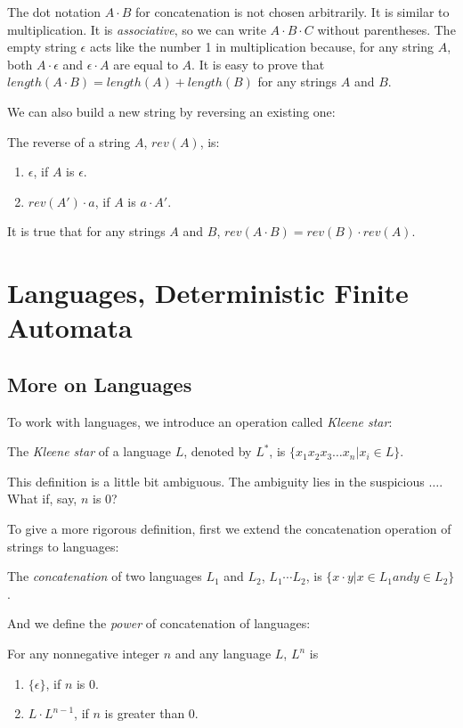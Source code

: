 \documentclass[11pt]{article}
\begin{document}
The dot notation $A \cdot B$ for concatenation is not chosen arbitrarily. It is similar to multiplication. It is \emph{associative}, so we can write $A \cdot B \cdot C$ without parentheses. The empty string $\epsilon$ acts like the number 1 in multiplication because, for any string $A$, both $A \cdot \epsilon$ and $\epsilon \cdot A$ are equal to $A$. It is easy to prove that $length(A \cdot B) = length(A) + length(B)$ for any strings $A$ and $B$.

We can also build a new string by reversing an existing one:
\begin{definition}
The reverse of a string $A$, $rev(A)$, is:
\begin{enumerate}
\item $\epsilon$, if $A$ is $\epsilon$.
\item $rev(A') \cdot a$, if $A$ is $a \cdot A'$.
\end{enumerate}
\end{definition}

It is true that for any strings $A$ and $B$, $rev(A \cdot B) = rev(B) \cdot rev(A)$.

\section{Languages, Deterministic Finite Automata}

\subsection{More on Languages}

To work with languages, we introduce an operation called \emph{Kleene star}:
\begin{definition}
The \emph{Kleene star} of a language $L$, denoted by $L^\ast$, is $\{x_1x_2x_3 \dots x_n | x_i \in L\}$.
\end{definition}

This definition is a little bit ambiguous. The ambiguity lies in the suspicious $\dots$. What if, say, $n$
is $0$?

To give a more rigorous definition, first we extend the concatenation operation of strings to languages:
\begin{definition}
The \emph{concatenation} of two languages $L_1$ and $L_2$, $L_1 \cdots L_2$, is $\{x \cdot y | x \in L_1 and y \in L_2\}$.
\end{definition}

And we define the \emph{power} of concatenation of languages:
\begin{definition}
For any nonnegative integer $n$ and any language $L$, $L^n$ is
\begin{enumerate}
\item $\{\epsilon\}$, if $n$ is $0$.
\item $L \cdot L^{n-1}$, if $n$ is greater than $0$.
\end{enumerate}
\end{definition}
\end{document}

